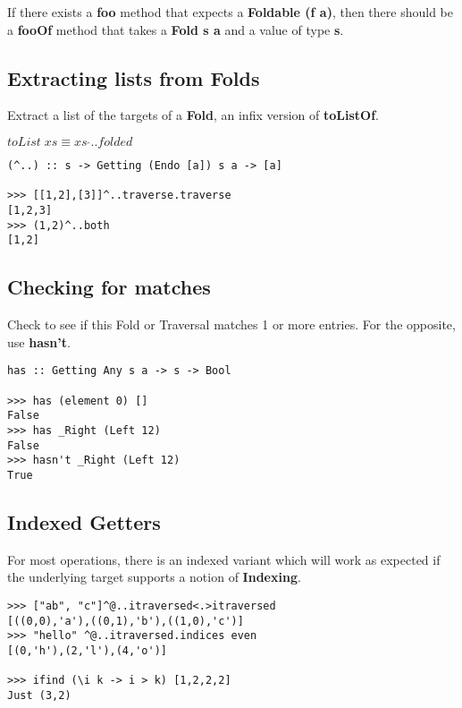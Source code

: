 \begin{multicols}{2}
\begin{box1}
If there exists a \textbf{foo} method that expects a
\textbf{Foldable (f a)}, then there should be a \textbf{fooOf} method that
takes a \textbf{Fold s a} and a value of type \textbf{s}.

\end{box1}

\begin{box2}
\subsection *{Extracting lists from Folds}

Extract a list of the targets of a \textbf{Fold}, an infix version of
\textbf{toListOf}.

$ toList\;xs \equiv xs\;\hat{}.. folded $

\begin{verbatim}
(^..) :: s -> Getting (Endo [a]) s a -> [a] 

>>> [[1,2],[3]]^..traverse.traverse
[1,2,3]
>>> (1,2)^..both
[1,2]
\end{verbatim}
\end{box2}

\begin{box1}
\subsection *{Checking for matches}

Check to see if this Fold or Traversal matches 1 or more entries. For the
opposite, use \textbf{hasn't}.

\begin{verbatim}
has :: Getting Any s a -> s -> Bool

>>> has (element 0) []
False
>>> has _Right (Left 12)
False
>>> hasn't _Right (Left 12)
True
\end{verbatim}
\end{box1}


\begin{box2}
\subsection*{Indexed Getters}
For most operations, there is an indexed variant which will work as expected if
the underlying target supports a notion of \textbf{Indexing}.

\begin{verbatim}
>>> ["ab", "c"]^@..itraversed<.>itraversed  
[((0,0),'a'),((0,1),'b'),((1,0),'c')]
>>> "hello" ^@..itraversed.indices even
[(0,'h'),(2,'l'),(4,'o')]

>>> ifind (\i k -> i > k) [1,2,2,2]
Just (3,2)
\end{verbatim}
\end{box2}
\end{multicols}

